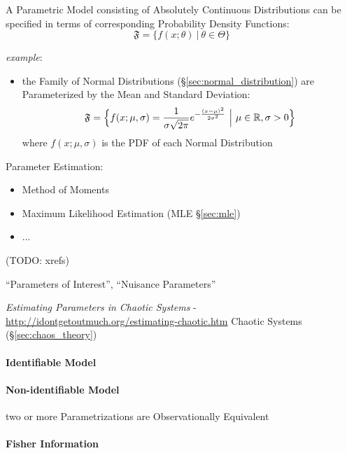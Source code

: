 A Parametric Model consisting of Absolutely Continuous Distributions
can be specified in terms of corresponding Probability Density Functions:
\[
  \mathfrak{F} = \{ f(x; \theta) \ |\ \theta \in \Theta \}
\]

\emph{example}:
\begin{itemize}
  \item the Family of Normal Distributions (\S\ref{sec:normal_distribution}) are
    Parameterized by the Mean and Standard Deviation:
    \[
      \mathfrak{F} = \Big\{
        f(x; \mu, \sigma) =
          \frac{1}{\sigma\sqrt{2\pi}}e^{-\frac{(x-\mu)^2}{2\sigma^2}}
        \ \Big|\ \mu \in \mathbb{R}, \sigma > 0
      \Big\}
    \]
    where $f(x; \mu, \sigma)$ is the PDF of each Normal Distribution
\end{itemize}

Parameter Estimation:
\begin{itemize}
  \item Method of Moments
  \item Maximum Likelihood Estimation (MLE \S\ref{sec:mle})
  \item ...
\end{itemize}
(TODO: xrefs)

``Parameters of Interest'', ``Nuisance Parameters''

\emph{Estimating Parameters in Chaotic Systems} -
\url{http://idontgetoutmuch.org/estimating-chaotic.htm} \fist Chaotic Systems
(\S\ref{sec:chaos_theory})



\paragraph{Identifiable Model}\label{sec:identifiable_model}\hfill

\paragraph{Non-identifiable Model}\label{sec:nonidentifiable_model}\hfill

two or more Parametrizations are Observationally Equivalent



\paragraph{Fisher Information}\label{sec:fisher_information}\hfill

